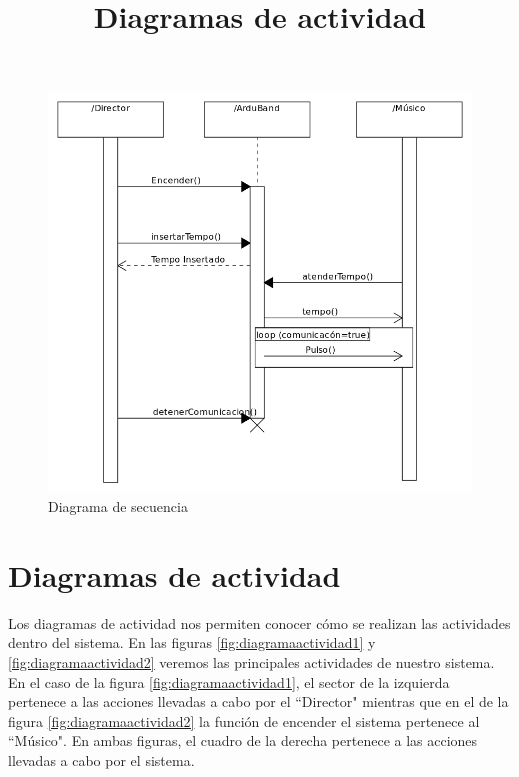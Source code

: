 \begin{figure}[!htb]
\centering
\includegraphics[width=1\textwidth]{./imagenes/diagramasecuencia}
\caption{Diagrama de secuencia} \label{fig:diagramasecuencia}
\end{figure}

\section{Diagramas de actividad}
\title{Diagramas de actividad}

Los diagramas de actividad nos permiten conocer cómo se realizan
las actividades dentro del sistema. En las figuras \ref{fig:diagramaactividad1} y \ref{fig:diagramaactividad2}
veremos las principales actividades de nuestro sistema. En el caso de la figura \ref{fig:diagramaactividad1},
el sector de la izquierda pertenece a las acciones llevadas a cabo por el ``Director" mientras que en el de la figura
\ref{fig:diagramaactividad2} la función de encender el sistema pertenece al ``Músico". En ambas
figuras, el cuadro de la derecha pertenece a las acciones llevadas a cabo por el sistema.\\

